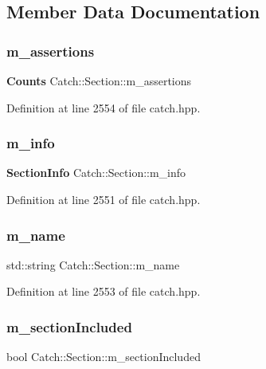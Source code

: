 \subsection{Member Data Documentation}
\mbox{\label{class_catch_1_1_section_ae0a2acc394d4bd1bc7a51a1445d25034}} 
\subsubsection{m\_assertions}
{\footnotesize\ttfamily \textbf{ Counts} Catch\+::\+Section\+::m\+\_\+assertions\hspace{0.3cm}{\ttfamily [private]}}



Definition at line 2554 of file catch.\+hpp.

\mbox{\label{class_catch_1_1_section_a22f54832b33b341ae5a78807a6219af6}} 
\subsubsection{m\_info}
{\footnotesize\ttfamily \textbf{ Section\+Info} Catch\+::\+Section\+::m\+\_\+info\hspace{0.3cm}{\ttfamily [private]}}



Definition at line 2551 of file catch.\+hpp.

\mbox{\label{class_catch_1_1_section_a29a372077fda582bbd79fb192067f277}} 
\subsubsection{m\_name}
{\footnotesize\ttfamily std\+::string Catch\+::\+Section\+::m\+\_\+name\hspace{0.3cm}{\ttfamily [private]}}



Definition at line 2553 of file catch.\+hpp.

\mbox{\label{class_catch_1_1_section_a038bb0d5d2718df6e3ae1ece4b3d695d}} 
\subsubsection{m\_sectionIncluded}
{\footnotesize\ttfamily bool Catch\+::\+Section\+::m\+\_\+section\+Included\hspace{0.3cm}{\ttfamily [private]}}



